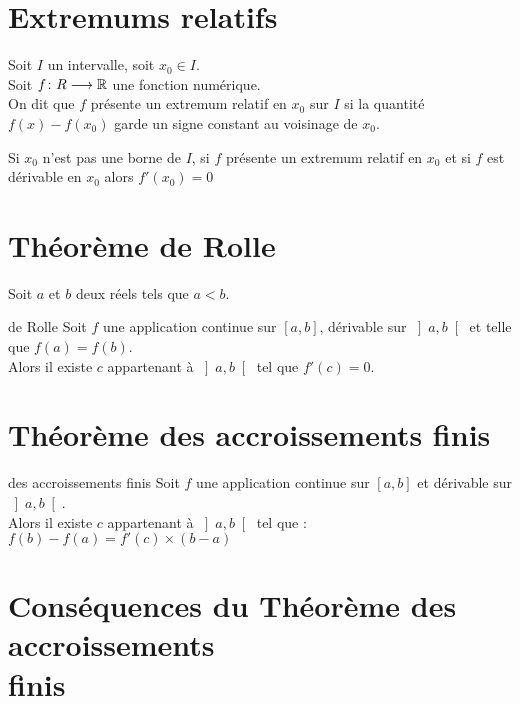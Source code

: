 \documentclass[12pt,twoside,a4paper]{article}
\author{MPSI 2}
\begin{document}
	\maketitle
	\section{Extremums relatifs}
		\begin{defi}
			Soit $I$ un intervalle, soit $x_0\in I$. \\
			Soit $f\colon R\longrightarrow\mathbb{R}$ une fonction num\'erique. \\
			On dit que $f$ pr\'esente un extremum relatif en $x_0$ sur $I$ si la quantit\'e $f\left(x\right)-f\left(x_0\right)$ garde un signe constant au voisinage de $x_0$.
		\end{defi}
		\begin{prop}
			Si $x_0$ n'est pas une borne de $I$, si $f$ pr\'esente un extremum relatif en $x_0$ et si $f$ est d\'erivable en $x_0$ alors $f'\left(x_0\right)=0$
		\end{prop}
	\section{Th\'eor\`eme de Rolle}
		\begin{flushleft}
			Soit $a$ et $b$ deux r\'eels tels que $a<b$.
		\end{flushleft}
		\begin{theo}{de Rolle}
			Soit $f$ une application continue sur $\left[a,b\right]$, d\'erivable sur $\left]a,b\right[$ et telle que $f\left(a\right)=f\left(b\right)$. \\
			Alors il existe $c$ appartenant \`a $\left]a,b\right[$ tel que  $f'\left(c\right)=0$.
		\end{theo}
	\section{Th\'eor\`eme des accroissements finis}
		\begin{theo}{des accroissements finis}
			Soit $f$ une application continue sur $\left[a,b\right]$ et d\'erivable sur $\left]a,b\right[$. \\
			Alors il existe $c$ appartenant \`a $\left]a,b\right[$ tel que : $f(b)-f(a)=f'(c)\times(b-a)$
		\end{theo}
	\section{Cons\'equences du Th\'eor\`eme des accroissements \\ finis}
\end{document}
